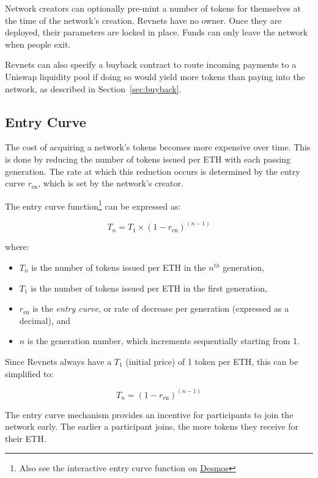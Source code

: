 \documentclass{article}
\begin{document}
Network creators can optionally pre-mint a number of tokens for themselves at the time of the network's creation. Revnets have no owner. Once they are deployed, their parameters are locked in place. Funds can only leave the network when people exit.

Revnets can also specify a buyback contract to route incoming payments to a Uniswap liquidity pool if doing so would yield more tokens than paying into the network, as described in Section~\ref{sec:buyback}.

\subsection{Entry Curve}

The cost of acquiring a network's tokens becomes more expensive over time. This is done by reducing the number of tokens issued per ETH with each passing generation. The rate at which this reduction occurs is determined by the entry curve $r_{\text{en}}$, which is set by the network's creator.

The entry curve function\footnote{Also see the interactive entry curve function on \href{https://www.desmos.com/calculator/ey9fhuslwe}{Desmos}} can be expressed as:

\begin{equation}
  T_n = T_1 \times (1 - r_{\text{en}})^{(n - 1)}
\end{equation}

where:
\begin{itemize}
  \item $T_n$ is the number of tokens issued per ETH in the $n^{th}$ generation,
  \item $T_1$ is the number of tokens issued per ETH in the first generation,
  \item $r_{\text{en}}$ is the \textit{entry curve}, or rate of decrease per generation (expressed as a decimal), and
  \item $n$ is the generation number, which increments sequentially starting from 1.
\end{itemize}

Since Revnets always have a $T_1$ (initial price) of 1 token per ETH, this can be simplified to:

\begin{equation}
  T_n = (1 - r_{\text{en}})^{(n - 1)}
\end{equation}

The entry curve mechanism provides an incentive for participants to join the network early. The earlier a participant joins, the more tokens they receive for their ETH.
\end{document}
